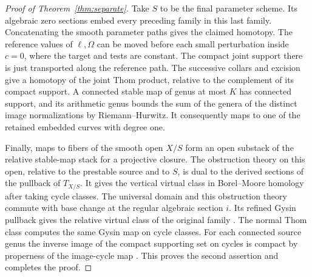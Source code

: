 \begin{proof}[Proof of Theorem~\ref{thm:separate}]
Take $S$ to be the final parameter scheme. Its algebraic zero sections
embed every preceding family in this last family. Concatenating the
smooth parameter paths gives the claimed homotopy. The reference
values of $\ell,\Omega$ can be moved before each small perturbation
inside $c=0$, where the target and tests are constant. The compact
joint support there is just transported along the reference path.
The successive collars and excision give a homotopy of the joint
Thom product, relative to the complement of its compact support.
A connected stable map of genus at most $K$ has connected support,
and its arithmetic genus bounds the sum of the genera of the distinct
image normalizations by Riemann--Hurwitz. It consequently maps to
one of the retained embedded curves with degree one.

Finally, maps to fibers of the smooth open $X/S$ form an open
substack of the relative stable-map stack for a projective closure.
The obstruction theory on this open, relative to the prestable source
and to $S$, is dual to the derived sections of the pullback of
$T_{X/S}$. It gives the vertical virtual class in Borel--Moore homology
after taking cycle classes. The universal domain and this obstruction
theory commute with base change at the regular algebraic section $i$.
Its refined Gysin pullback gives the relative virtual class of the
original family \cite[\S7]{BF}. The normal Thom class computes the
same Gysin map on cycle classes. For each connected source genus the inverse
image of the compact supporting set on cycles is compact by
properness of the image-cycle map \cite{WueProduct}. This proves the second
assertion and completes the proof.
\end{proof}
